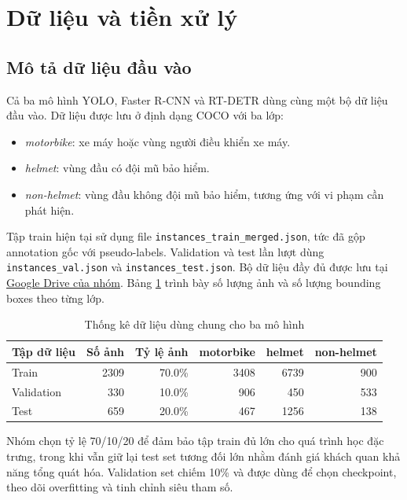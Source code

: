 \section{Dữ liệu và tiền xử lý}

\subsection{Mô tả dữ liệu đầu vào}

Cả ba mô hình YOLO, Faster R-CNN và RT-DETR dùng cùng một bộ dữ liệu đầu vào. Dữ liệu được lưu ở định dạng COCO với ba lớp:

\begin{itemize}
    \item \textit{motorbike}: xe máy hoặc vùng người điều khiển xe máy.
    \item \textit{helmet}: vùng đầu có đội mũ bảo hiểm.
    \item \textit{non-helmet}: vùng đầu không đội mũ bảo hiểm, tương ứng với vi phạm cần phát hiện.
\end{itemize}

Tập train hiện tại sử dụng file \texttt{instances\_train\_merged.json}, tức đã gộp annotation gốc với pseudo-labels. Validation và test lần lượt dùng \texttt{instances\_val.json} và \texttt{instances\_test.json}. Bộ dữ liệu đầy đủ được lưu tại \href{https://drive.google.com/drive/folders/1jA9XzUURPAWx9Cwcamh4V9tXWBrFJVt6?usp=drive_link}{Google Drive của nhóm}. Bảng \ref{tab:dataset-stats} trình bày số lượng ảnh và số lượng bounding boxes theo từng lớp.

\begin{table}[H]
    \centering
    \caption{Thống kê dữ liệu dùng chung cho ba mô hình}
    \label{tab:dataset-stats}
    \begin{tabular}{lrrrrr}
        \toprule
        \textbf{Tập dữ liệu} & \textbf{Số ảnh} & \textbf{Tỷ lệ ảnh} & \textbf{motorbike} & \textbf{helmet} & \textbf{non-helmet} \\
        \midrule
        Train & 2309 & 70.0\% & 3408 & 6739 & 900 \\
        Validation & 330 & 10.0\% & 906 & 450 & 533 \\
        Test & 659 & 20.0\% & 467 & 1256 & 138 \\
        \bottomrule
    \end{tabular}
\end{table}

Nhóm chọn tỷ lệ 70/10/20 để đảm bảo tập train đủ lớn cho quá trình học đặc trưng, trong khi vẫn giữ lại test set tương đối lớn nhằm đánh giá khách quan khả năng tổng quát hóa. Validation set chiếm 10\% và được dùng để chọn checkpoint, theo dõi overfitting và tinh chỉnh siêu tham số.

